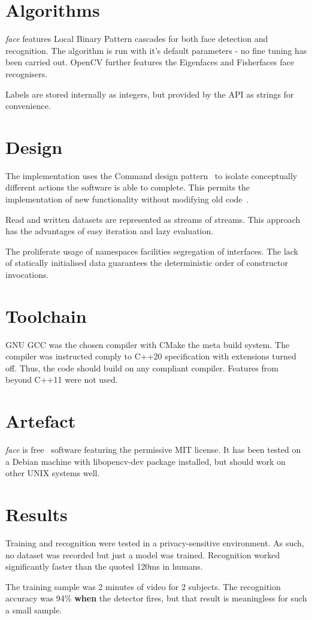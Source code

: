 \documentclass{article}
\newcommand{\face}[0]{\textit{face }}
\newcommand{\para}[0]{\\ \par \noindent}
\begin{document}
\section{Algorithms}
\face features Local Binary Pattern cascades for both face detection and recognition.
The algorithm is run with it's default parameters - no fine tuning has been carried out.
OpenCV further features the Eigenfaces and Fisherfaces face recognisers.
\para
Labels are stored internally as integers, but provided by the API as strings for convenience.


\section{Design}
The implementation uses the Command design pattern~\cite{schmid} to isolate conceptually different actions the software is able to complete.
This permits the implementation of new functionality without modifying old code~\cite{kalemis}.
\para
Read and written datasets are represented as streams of streams.
This approach has the advantages of easy iteration and lazy evaluation.
\para
The proliferate usage of namespaces facilities segregation of interfaces.
The lack of statically initialised data guarantees the deterministic order of constructor invocations.


\section{Toolchain}
GNU GCC was the chosen compiler with CMake the meta build system.
The compiler was instructed comply to C++20 specification with extensions turned off.
Thus, the code should build on any compliant compiler.
Features from beyond C++11 were not used.


\section{Artefact}
\face is free~\cite{miro} software featuring the permissive MIT license.
It has been tested on a Debian machine with libopencv-dev package installed, but should work on other UNIX systems well. 


\section{Results}
Training and recognition were tested in a privacy-sensitive environment.
As such, no dataset was recorded but just a model was trained.
Recognition worked significantly faster than the quoted 120ms in humans.
\para
The training sample was 2 minutes of video for 2 subjects.
The recognition accuracy was 94\% \textbf{when} the detector fires, but that result is meaningless for such a small sample.
\end{document}
